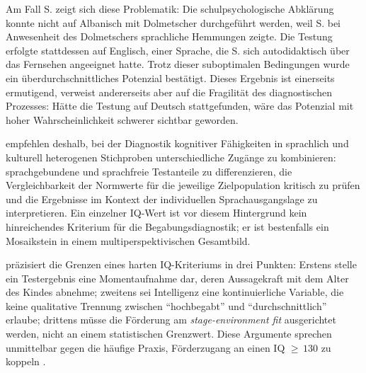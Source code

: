 \documentclass[ngerman, a4paper]{article}
\begin{document}
Am Fall S. zeigt sich diese Problematik: Die schulpsychologische Abklärung
konnte nicht auf Albanisch mit Dolmetscher durchgeführt werden, weil S.
bei Anwesenheit des Dolmetschers sprachliche Hemmungen zeigte. Die Testung
erfolgte stattdessen auf Englisch, einer Sprache, die S. sich
autodidaktisch über das Fernsehen angeeignet hatte. Trotz dieser
suboptimalen Bedingungen wurde ein überdurchschnittliches Potenzial
bestätigt. Dieses Ergebnis ist einerseits ermutigend, verweist
andererseits aber auf die Fragilität des diagnostischen Prozesses: Hätte
die Testung auf Deutsch stattgefunden, wäre das Potenzial mit hoher
Wahrscheinlichkeit schwerer sichtbar geworden.

\textcite[S.\,158\,f.,\,163--165]{haag2018leistungsstanddiagnostik}
empfehlen deshalb, bei der Diagnostik kognitiver Fähigkeiten in
sprachlich und kulturell heterogenen Stichproben unterschiedliche
Zugänge zu kombinieren: sprachgebundene und sprachfreie Testanteile zu
differenzieren, die Vergleichbarkeit der Normwerte für die jeweilige
Zielpopulation kritisch zu prüfen und die Ergebnisse im Kontext der
individuellen Sprachausgangslage zu interpretieren. Ein einzelner
IQ-Wert ist vor diesem Hintergrund kein hinreichendes Kriterium für die
Begabungsdiagnostik; er ist bestenfalls ein Mosaikstein in einem
multiperspektivischen Gesamtbild.

\textcite[S.\,117]{baudson2021wasdenken} präzisiert die Grenzen eines harten
IQ-Kriteriums in drei Punkten: Erstens stelle ein Testergebnis eine Momentaufnahme
dar, deren Aussagekraft mit dem Alter des Kindes abnehme; zweitens sei Intelligenz
eine kontinuierliche Variable, die keine qualitative Trennung zwischen
\enquote{hochbegabt} und \enquote{durchschnittlich} erlaube; drittens müsse die
Förderung am \textit{stage-environment fit} ausgerichtet werden, nicht an einem
statistischen Grenzwert. Diese Argumente sprechen unmittelbar gegen die häufige
Praxis, Förderzugang an einen IQ ${\geq}\,130$ zu koppeln
\parencite[S.\,115]{baudson2021wasdenken}.
\end{document}
